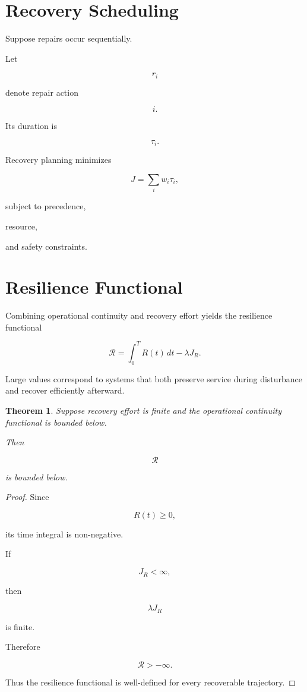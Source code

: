 \documentclass[11pt,fleqn]{book}
\numberwithin{equation}{chapter}
\theoremstyle{plain}
\newtheorem{theorem}{Theorem}[chapter]
\theoremstyle{definition}
\theoremstyle{remark}
\begin{document}

\section{Recovery Scheduling}

Suppose repairs occur sequentially.

Let

\[
r_i
\]

denote repair action

\[
i.
\]

Its duration is

\[
\tau_i.
\]

Recovery planning minimizes

\[
\boxed{
J
=
\sum_i
w_i
\tau_i,
}
\]

subject to precedence,

resource,

and safety constraints.


\section{Resilience Functional}

Combining operational continuity and recovery effort yields the
resilience functional

\[
\boxed{
\mathcal R
=
\int_0^T
R(t)\,dt
-
\lambda
J_R.
}
\]

Large values correspond to systems that both preserve service during
disturbance and recover efficiently afterward.


\begin{theorem}

Suppose recovery effort is finite and the operational continuity
functional is bounded below.

Then

\[
\mathcal R
\]

is bounded below.

\end{theorem}

\begin{proof}

Since

\[
R(t)\ge0,
\]

its time integral is non-negative.

If

\[
J_R<\infty,
\]

then

\[
\lambda J_R
\]

is finite.

Therefore

\[
\mathcal R
>
-\infty.
\]

Thus the resilience functional is well-defined for every recoverable
trajectory.

\end{proof}
\end{document}
